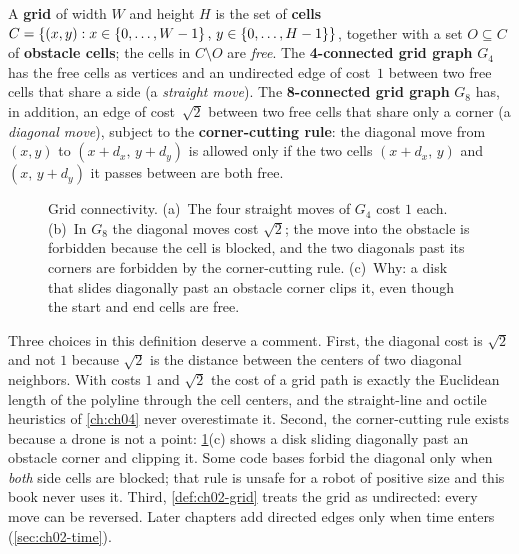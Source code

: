 \begin{definition}
\label{def:ch02-grid}
A \textbf{grid} of width $W$ and height $H$ is the set of \textbf{cells} $C=\left\{ (x,y) : x\in\left\{ 0,\dots,W-1 \right\},\,y\in\left\{ 0,\dots,H-1 \right\} \right\}$, together with a set $O\subseteq C$ of \textbf{obstacle cells}; the cells in $C\setminus O$ are \emph{free}. The \textbf{4-connected grid graph} $G_4$ has the free cells as vertices and an undirected edge of cost~$1$ between two free cells that share a side (a \emph{straight move}). The \textbf{8-connected grid graph} $G_8$ has, in addition, an edge of cost~$\sqrt{2}$ between two free cells that share only a corner (a \emph{diagonal move}), subject to the \textbf{corner-cutting rule}: the diagonal move from $(x,y)$ to $(x+d_x,\,y+d_y)$ is allowed only if the two cells $(x+d_x,\,y)$ and $(x,\,y+d_y)$ it passes between are both free.
\end{definition}

\begin{figure}[tb]
  \centering
  \caption{Grid connectivity. (a)~The four straight moves of $G_4$ cost $1$ each. (b)~In $G_8$ the diagonal moves cost $\sqrt{2}$; the move into the obstacle is forbidden because the cell is blocked, and the two diagonals past its corners are forbidden by the corner-cutting rule. (c)~Why: a disk that slides diagonally past an obstacle corner clips it, even though the start and end cells are free.}
  \label{fig:ch02-grid-connectivity}
\end{figure}

Three choices in this definition deserve a comment. First, the diagonal cost is $\sqrt2$ and not $1$ because $\sqrt2$ is the distance between the centers of two diagonal neighbors. With costs $1$ and $\sqrt2$ the cost of a grid path is exactly the Euclidean length of the polyline through the cell centers, and the straight-line and octile heuristics of \cref{ch:ch04} never overestimate it. Second, the corner-cutting rule exists because a drone is not a point: \cref{fig:ch02-grid-connectivity}(c) shows a disk sliding diagonally past an obstacle corner and clipping it. Some code bases forbid the diagonal only when \emph{both} side cells are blocked; that rule is unsafe for a robot of positive size and this book never uses it. Third, \cref{def:ch02-grid} treats the grid as undirected: every move can be reversed. Later chapters add directed edges only when time enters (\cref{sec:ch02-time}).

